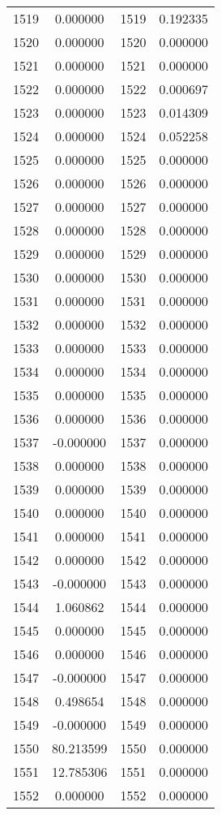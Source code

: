 \documentclass[12pt]{article}
\begin{document}
\begin{longtable}{@{}cccc@{}}
1519 & 0.000000 & 1519 & 0.192335 \\
1520 & 0.000000 & 1520 & 0.000000 \\
1521 & 0.000000 & 1521 & 0.000000 \\
1522 & 0.000000 & 1522 & 0.000697 \\
1523 & 0.000000 & 1523 & 0.014309 \\
1524 & 0.000000 & 1524 & 0.052258 \\
1525 & 0.000000 & 1525 & 0.000000 \\
1526 & 0.000000 & 1526 & 0.000000 \\
1527 & 0.000000 & 1527 & 0.000000 \\
1528 & 0.000000 & 1528 & 0.000000 \\
1529 & 0.000000 & 1529 & 0.000000 \\
1530 & 0.000000 & 1530 & 0.000000 \\
1531 & 0.000000 & 1531 & 0.000000 \\
1532 & 0.000000 & 1532 & 0.000000 \\
1533 & 0.000000 & 1533 & 0.000000 \\
1534 & 0.000000 & 1534 & 0.000000 \\
1535 & 0.000000 & 1535 & 0.000000 \\
1536 & 0.000000 & 1536 & 0.000000 \\
1537 & -0.000000 & 1537 & 0.000000 \\
1538 & 0.000000 & 1538 & 0.000000 \\
1539 & 0.000000 & 1539 & 0.000000 \\
1540 & 0.000000 & 1540 & 0.000000 \\
1541 & 0.000000 & 1541 & 0.000000 \\
1542 & 0.000000 & 1542 & 0.000000 \\
1543 & -0.000000 & 1543 & 0.000000 \\
1544 & 1.060862 & 1544 & 0.000000 \\
1545 & 0.000000 & 1545 & 0.000000 \\
1546 & 0.000000 & 1546 & 0.000000 \\
1547 & -0.000000 & 1547 & 0.000000 \\
1548 & 0.498654 & 1548 & 0.000000 \\
1549 & -0.000000 & 1549 & 0.000000 \\
1550 & 80.213599 & 1550 & 0.000000 \\
1551 & 12.785306 & 1551 & 0.000000 \\
1552 & 0.000000 & 1552 & 0.000000 \\

\end{longtable}
\end{document}
